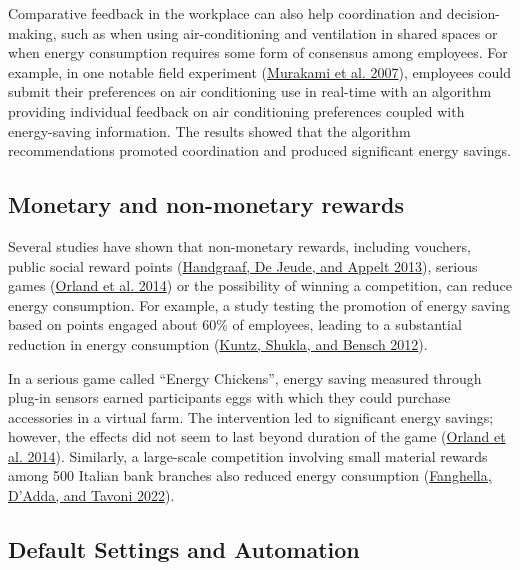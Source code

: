 \documentclass[
  11pt,
]{article}
\begin{document}
Comparative feedback in the workplace can also help coordination and
decision-making, such as when using air-conditioning and ventilation in
shared spaces or when energy consumption requires some form of consensus
among employees. For example, in one notable field experiment
(\protect\hyperlink{ref-murakami2007field}{Murakami et al. 2007}),
employees could submit their preferences on air conditioning use in
real-time with an algorithm providing individual feedback on air
conditioning preferences coupled with energy-saving information. The
results showed that the algorithm recommendations promoted coordination
and produced significant energy savings.

\hypertarget{monetary-and-non-monetary-rewards}{%
\subsection{Monetary and non-monetary
rewards}\label{monetary-and-non-monetary-rewards}}

Several studies have shown that non-monetary rewards, including
vouchers, public social reward points
(\protect\hyperlink{ref-handgraaf2013public}{Handgraaf, De Jeude, and
Appelt 2013}), serious games
(\protect\hyperlink{ref-orland2014saving}{Orland et al. 2014}) or the
possibility of winning a competition, can reduce energy consumption. For
example, a study testing the promotion of energy saving based on points
engaged about 60\% of employees, leading to a substantial reduction in
energy consumption (\protect\hyperlink{ref-kuntz2012many}{Kuntz, Shukla,
and Bensch 2012}).

In a serious game called ``Energy Chickens'', energy saving measured
through plug-in sensors earned participants eggs with which they could
purchase accessories in a virtual farm. The intervention led to
significant energy savings; however, the effects did not seem to last
beyond duration of the game
(\protect\hyperlink{ref-orland2014saving}{Orland et al. 2014}).
Similarly, a large-scale competition involving small material rewards
among 500 Italian bank branches also reduced energy consumption
(\protect\hyperlink{ref-fanghella2022evaluating}{Fanghella, D'Adda, and
Tavoni 2022}).

\hypertarget{default-settings-and-automation}{%
\subsection{Default Settings and
Automation}\label{default-settings-and-automation}}
\end{document}
